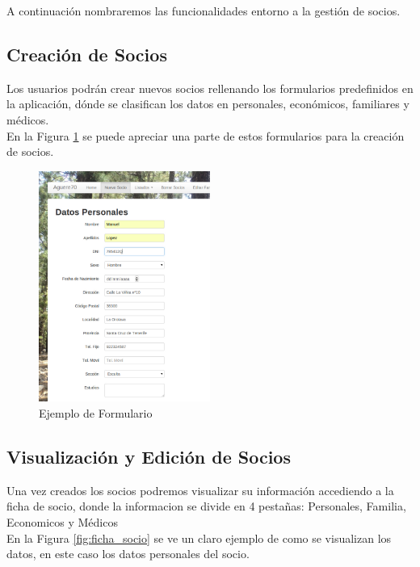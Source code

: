 A continuación nombraremos las funcionalidades entorno a la gestión de socios.

\subsection{Creación de Socios}

Los usuarios podrán crear nuevos socios rellenando los formularios predefinidos en la aplicación, dónde se clasifican los datos en personales, económicos, familiares y médicos.\\

En la Figura \ref{fig:form} se puede apreciar una parte de estos formularios para la creación de socios.

\begin{figure}[H]
\begin{center}
\includegraphics[width=0.5\textwidth]{images/ejemplo_formulario_personal.jpg}
\caption{Ejemplo de Formulario}
\label{fig:form}
\end{center}
\end{figure}

\subsection{Visualización y Edición de Socios}

Una vez creados los socios podremos visualizar su información accediendo a la ficha de socio, donde la informacion se divide en 4 pestañas: Personales, Familia, Economicos y Médicos \\

En la Figura \ref{fig:ficha_socio} se ve un claro ejemplo de como se visualizan los datos, en este caso los datos personales del socio.\\

